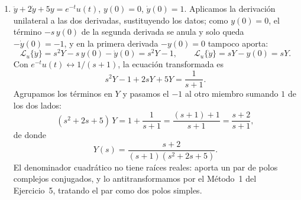 \documentclass[10pt,a4paper]{article}
\begin{document}
\begin{enumerate}
	\item $\ddot y+2\dot y+5y=e^{-t}u(t)$, $y(0)=0$, $\dot y(0)=1$. Aplicamos
	la derivación unilateral a las dos derivadas, sustituyendo los datos; como
	$y(0)=0$, el término $-s\,y(0)$ de la segunda derivada se anula y solo
	queda $-\dot y(0)=-1$, y en la primera derivada $-y(0)=0$ tampoco aporta:
	\[
		\mathcal{L}_u\{\ddot y\}=s^2Y-s\,y(0)-\dot y(0)=s^2Y-1,
		\qquad
		\mathcal{L}_u\{\dot y\}=sY-y(0)=sY.
	\]
	Con $e^{-t}u(t)\leftrightarrow 1/(s+1)$, la ecuación transformada es
	\[
		s^2Y-1+2sY+5Y=\frac{1}{s+1}.
	\]
	Agrupamos los términos en $Y$ y pasamos el $-1$ al otro miembro sumando
	$1$ de los dos lados:
	\[
		(s^2+2s+5)\,Y=1+\frac{1}{s+1}=\frac{(s+1)+1}{s+1}=\frac{s+2}{s+1},
	\]
	de donde
	\[
		Y(s)=\frac{s+2}{(s+1)(s^2+2s+5)}.
	\]
	El denominador cuadrático no tiene raíces reales: aporta un par de polos
	complejos conjugados, y lo antitransformamos por el Método~1 del
	Ejercicio~5, tratando el par como dos polos simples.


\end{enumerate}
\end{document}
